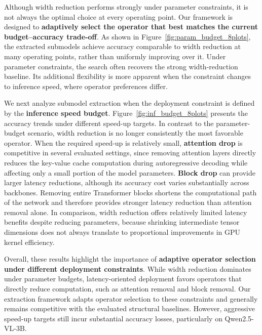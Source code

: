 \documentclass[11pt]{article}
\begin{document}
Although width reduction performs strongly under parameter constraints, it is not always the optimal choice at every operating point. 
Our framework is designed to \textbf{adaptively select the operator that best matches the current budget–accuracy trade-off}. 
As shown in Figure~\ref{fig:param_budget_8plots}, the extracted submodels achieve accuracy comparable to width reduction at many operating points, rather than uniformly improving over it.
Under parameter constraints, the search often recovers the strong width-reduction baseline. Its additional flexibility is more apparent when the constraint changes to inference speed, where operator preferences differ.

We next analyze submodel extraction when the deployment constraint is defined by the \textbf{inference speed budget}. 
Figure~\ref{fig:inf_budget_8plots} presents the accuracy trends under different speed-up targets. 
In contrast to the parameter-budget scenario, width reduction is no longer consistently the most favorable operator. 
When the required speed-up is relatively small, \textbf{attention drop} is competitive in several evaluated settings, since removing attention layers directly reduces the key-value cache computation during autoregressive decoding while affecting only a small portion of the model parameters.
\textbf{Block drop} can provide larger latency reductions, although its accuracy cost varies substantially across backbones.
Removing entire Transformer blocks shortens the computational path of the network and therefore provides stronger latency reduction than attention removal alone. 
In comparison, width reduction offers relatively limited latency benefits despite reducing parameters, because shrinking intermediate tensor dimensions does not always translate to proportional improvements in GPU kernel efficiency.

Overall, these results highlight the importance of \textbf{adaptive operator selection under different deployment constraints}. 
While width reduction dominates under parameter budgets, latency-oriented deployment favors operators that directly reduce computation, such as attention removal and block removal. 
Our extraction framework adapts operator selection to these constraints and generally remains competitive with the evaluated structural baselines. However, aggressive speed-up targets still incur substantial accuracy losses, particularly on Qwen2.5-VL-3B.
\end{document}
